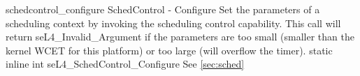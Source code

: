 %
%
%
%

\apidoc
{schedcontrol_configure}
{SchedControl - Configure}
{Set the parameters of a scheduling context by invoking the scheduling control capability.
This call will return seL4\_Invalid\_Argument if the parameters are too small (smaller than the kernel WCET for this platform) or too large (will overflow the timer).}
{static inline int seL4\_SchedControl\_Configure }
{
}
{\errorenumdesc}
{See \autoref{sec:sched}}
